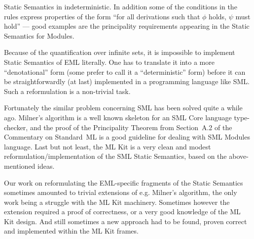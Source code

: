 {
Static Semantics in indeterministic.
In addition some of the conditions in the rules
express properties of the form ``for all derivations
such that $\phi$ holds, $\psi$ must hold'' --- good examples
are the principality requirements appearing in the Static Semantics for Modules.

Because of the quantification over infinite sets,
it is impossible to implement Static Semantics of EML
literally.
One has to translate it into a more ``denotational'' form
(some prefer to call it a ``deterministic'' form)
before it can be straightforwardly (at last)
implemented in a programming language like SML.
Such a reformulation is a non-trivial task.

Fortunately the similar problem concerning SML 
has been solved quite a while ago.
Milner's algorithm \cite{DM82} 
is a well known skeleton for 
an SML Core language type-checker,
and the proof of the Principality Theorem
from Section~A.2 of the Commentary on Standard~ML \cite{MT91}
is a good guideline for dealing with SML Modules language.
Last but not least, the ML Kit is a very clean and modest
reformulation/implementation of the SML Static Semantics,
based on the above-mentioned ideas. 

Our work on reformulating the EML-specific
fragments of the Static Semantics sometimes
amounted to trivial extensions of e.g.
Milner's algorithm, the only work being
a struggle with the ML Kit machinery.
Sometimes however the extension required a proof of correctness,
or a very good knowledge of the ML Kit design.
And still sometimes a new approach had to be found,
proven correct and implemented within the ML Kit frames.
}
{}

